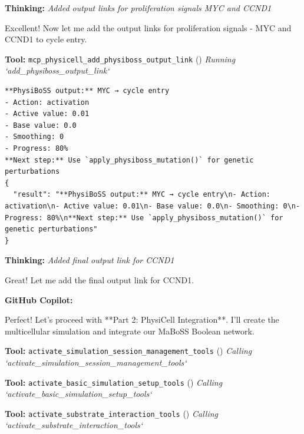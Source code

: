 \documentclass[11pt,a4paper]{article}
\begin{document}
\begin{thinkbox}
\textbf{Thinking:} \textit{Added output links for proliferation signals MYC and CCND1}

Excellent! Now let me add the output links for proliferation signals - MYC and CCND1 to cycle entry.

\end{thinkbox}
\begin{toolokbox}
\textbf{Tool:} \texttt{mcp\_physicell\_add\_physiboss\_output\_link} (\checkmark)
\textit{Running `add\_physiboss\_output\_link`}
\begin{lstlisting}
**PhysiBoSS output:** MYC → cycle entry
- Action: activation
- Active value: 0.01
- Base value: 0.0
- Smoothing: 0
- Progress: 80%
**Next step:** Use `apply_physiboss_mutation()` for genetic perturbations
{
  "result": "**PhysiBoSS output:** MYC → cycle entry\n- Action: activation\n- Active value: 0.01\n- Base value: 0.0\n- Smoothing: 0\n- Progress: 80%\n**Next step:** Use `apply_physiboss_mutation()` for genetic perturbations"
}
\end{lstlisting}
\end{toolokbox}
\begin{thinkbox}
\textbf{Thinking:} \textit{Added final output link for CCND1}

Great! Let me add the final output link for CCND1.

\end{thinkbox}
\begin{copilotbox}
\textbf{GitHub Copilot:}

Perfect! Let's proceed with **Part 2: PhysiCell Integration**. I'll create the multicellular simulation and integrate our MaBoSS Boolean network.

\end{copilotbox}
\begin{toolokbox}
\textbf{Tool:} \texttt{activate\_simulation\_session\_management\_tools} (\checkmark)
\textit{Calling `activate\_simulation\_session\_management\_tools`}
\end{toolokbox}
\begin{toolokbox}
\textbf{Tool:} \texttt{activate\_basic\_simulation\_setup\_tools} (\checkmark)
\textit{Calling `activate\_basic\_simulation\_setup\_tools`}
\end{toolokbox}
\begin{toolokbox}
\textbf{Tool:} \texttt{activate\_substrate\_interaction\_tools} (\checkmark)
\textit{Calling `activate\_substrate\_interaction\_tools`}
\end{toolokbox}
\end{document}
